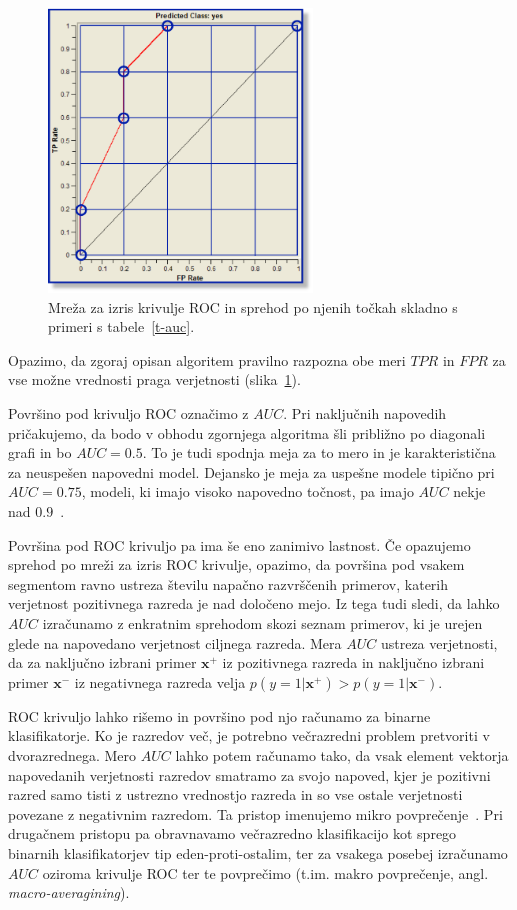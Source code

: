 \begin{figure}[htbp]
\begin{center}
\includegraphics[width=7cm]{slike/roc-walk.pdf}
\caption{Mreža za izris krivulje ROC in sprehod po njenih točkah skladno s primeri s tabele~\ref{t-auc}.}
\label{f-roc-walk}
\end{center}
\end{figure}

Opazimo, da zgoraj opisan algoritem pravilno razpozna obe meri $TPR$ in $FPR$ za vse možne vrednosti praga verjetnosti (slika~\ref{f-roc-walk}).

Površino pod krivuljo ROC označimo z $AUC$. Pri naključnih napovedih pričakujemo, da bodo v obhodu zgornjega algoritma šli približno po diagonali grafi in bo $AUC=0.5$. To je tudi spodnja meja za to mero in je karakteristična za neuspešen napovedni model. Dejansko je meja za uspešne modele tipično pri $AUC=0.75$, modeli, ki imajo visoko napovedno točnost, pa imajo $AUC$ nekje nad $0.9$~\cite{Hanley1982}.

Površina pod ROC krivuljo pa ima še eno zanimivo lastnost. Če opazujemo sprehod po mreži za izris ROC krivulje, opazimo, da površina pod vsakem segmentom ravno ustreza številu napačno razvrščenih primerov, katerih verjetnost pozitivnega razreda je nad določeno mejo. Iz tega tudi sledi, da lahko $AUC$ izračunamo z enkratnim sprehodom skozi seznam primerov, ki je urejen glede na napovedano verjetnost ciljnega razreda. Mera $AUC$ ustreza verjetnosti, da za naključno izbrani primer ${\bm x}^+$ iz pozitivnega razreda in naključno izbrani primer ${\bm x}^-$ iz negativnega razreda velja $p(y=1|{\bm x}^+) > p(y=1|{\bm x}^-)$.

ROC krivuljo lahko rišemo in površino pod njo računamo za binarne klasifikatorje. Ko je razredov več, je potrebno večrazredni problem pretvoriti v dvorazrednega. Mero $AUC$ lahko potem računamo tako, da vsak element vektorja napovedanih verjetnosti razredov smatramo za svojo napoved, kjer je pozitivni razred samo tisti z ustrezno vrednostjo razreda in so vse ostale verjetnosti povezane z negativnim razredom. Ta pristop imenujemo mikro povprečenje~. Pri drugačnem pristopu pa obravnavamo večrazredno klasifikacijo kot sprego binarnih klasifikatorjev tip eden-proti-ostalim, ter za vsakega posebej izračunamo $AUC$ oziroma krivulje ROC ter te povprečimo (t.im. makro povprečenje, angl. {\em macro-averagining}).

